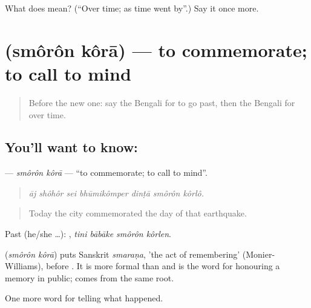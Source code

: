 \begin{tcolorbox}[breakable,colback=teal!4,colframe=teal!35!black,title={Before you move on}]
What does  mean? (\textquotedblleft{}Over time; as time went by\textquotedblright{}.) Say it once more.
\end{tcolorbox}
\section[\texorpdfstring{\bn{স্মরণ} \bn{করা} (smôrôn kôrā)}{স্মরণ করা (smôrôn kôrā)}]{  (smôrôn kôrā) — to commemorate; to call to mind}

\label{lesson:BN-C303-smoron-kora}



\begin{quote}
Before the new one: say the Bengali for to go past, then the Bengali for over time.
\end{quote}

\subsection*{You'll want to know:  }
\textbf{ } — \emph{smôrôn kôrā} — \textquotedblleft{}to commemorate; to call to mind\textquotedblright{}.

\begin{quote}
      
\end{quote}

\begin{quote}
\emph{āj shôhôr sei bhūmikômper dinṭā smôrôn kôrlô.}
\end{quote}

\begin{quote}
Today the city commemorated the day of that earthquake.
\end{quote}

Past (he/she …):    , \emph{tini bābāke smôrôn kôrlen}.

\begin{cousinweb}
\textbf{ } (\emph{smôrôn kôrā}) puts Sanskrit \emph{smaraṇa}, 'the act of remembering' (Monier-Williams), before . It is more formal than \textbf{ } and is the word for honouring a memory in public; \textbf{} comes from the same root.
\end{cousinweb}

\begin{grammarlens}[title={What you've built}]
One more word for telling what happened.
\end{grammarlens}


